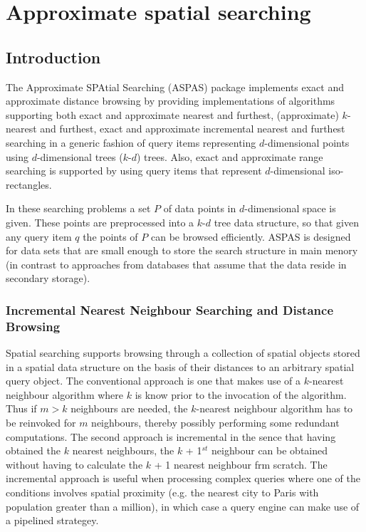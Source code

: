 \chapter{Approximate spatial searching}

\section{Introduction}

The Approximate SPAtial Searching (ASPAS) package implements
exact and approximate distance browsing
by providing implementations of algorithms supporting both exact and
approximate nearest and furthest, (approximate) $k$-nearest and furthest,
exact and approximate incremental nearest
and furthest searching in a generic fashion of query items
representing $d$-dimensional
points using $d$-dimensional trees
($k$-$d$) trees.
Also, exact and approximate range searching is
supported by using query items that represent
$d$-dimensional iso-rectangles.

In these searching problems a set $P$ of data points in $d$-dimensional
space is given.
These points are preprocessed into a $k$-$d$ tree data structure, so that given
any query item $q$ the points of $P$ can be browsed efficiently.
ASPAS is designed for data sets that are small enough to store
the search structure in main menory (in contrast to approaches
from databases that assume that the data reside in secondary storage).

\subsection{Incremental Nearest Neighbour Searching and Distance Browsing}

Spatial searching supports browsing through a collection of spatial objects
stored in a spatial data structure on the basis of their distances to an arbitrary spatial
query object. The conventional approach is one that makes use of a $k$-nearest neighbour
algorithm where $k$ is know prior to the invocation of the algorithm.
Thus if $m>k$ neighbours are needed, the $k$-nearest neighbour algorithm has to be
reinvoked for $m$ neighbours, thereby possibly performing some redundant computations.
The second approach is incremental in the sence that having obtained
the $k$ nearest neighbours, the $k$ + 1$^{st}$ neighbour can be obtained without
having to calculate the $k$ + 1 nearest neighbour frm scratch.
The incremental approach is useful when processing complex queries where
one of the conditions involves spatial proximity (e.g. the nearest city to Paris with
population greater than a million), in which case a query engine can make use of
a pipelined strategey.

